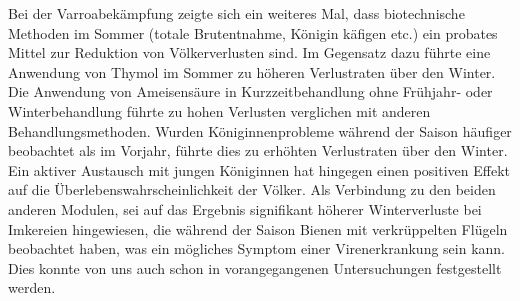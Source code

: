 \newline
Bei der Varroabekämpfung zeigte sich ein weiteres Mal, dass biotechnische Methoden im Sommer (totale Brutentnahme, Königin käfigen etc.) ein probates Mittel zur Reduktion von Völkerverlusten sind. Im Gegensatz dazu führte eine Anwendung von Thymol im Sommer zu höheren Verlustraten über den Winter. Die Anwendung von Ameisensäure in Kurzzeitbehandlung ohne Frühjahr- oder Winterbehandlung führte zu hohen Verlusten verglichen mit anderen Behandlungsmethoden.
\newline
Wurden Königinnenprobleme während der Saison häufiger beobachtet als im Vorjahr, führte dies zu erhöhten Verlustraten über den Winter. Ein aktiver Austausch mit jungen Königinnen hat hingegen einen positiven Effekt auf die Überlebenswahrscheinlichkeit der Völker.
\newline
Als Verbindung zu den beiden anderen Modulen, sei auf das Ergebnis signifikant höherer Winterverluste bei Imkereien hingewiesen, die während der Saison Bienen mit verkrüppelten Flügeln beobachtet haben, was ein mögliches Symptom einer Virenerkrankung sein kann. Dies konnte von uns auch schon in vorangegangenen Untersuchungen festgestellt werden.
